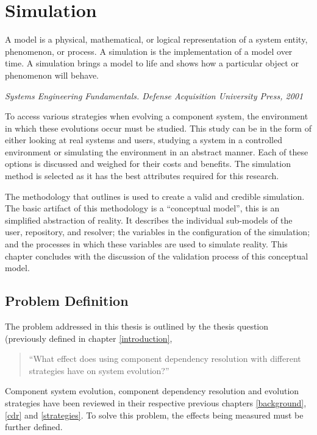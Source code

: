 \chapter{Simulation}
\label{simulation}
\epigraph{A model is a physical, mathematical, or logical representation of a system entity, phenomenon, or process. 
A simulation is the implementation of a model over time. 
A simulation brings a model to life and shows how a particular object or phenomenon will behave.}
{\textit{Systems Engineering Fundamentals. Defense Acquisition University Press, 2001}}

{}To access various strategies when evolving a component system, the environment in which these evolutions occur must be studied.
{}This study can be in the form of either looking at real systems and users, studying a system in a controlled environment or simulating the environment in an abstract manner.
{}Each of these options is discussed and weighed for their costs and benefits.
{}The simulation method is selected as it has the best attributes required for this research.

{}The methodology that \citep{Law2005} outlines is used to create a valid and credible simulation.
{}The basic artifact of this methodology is a ``conceptual model'', this is an simplified abstraction of reality.
{}It describes the individual sub-models of the user, repository, and resolver; the variables in the configuration of the simulation;
{}and the processes in which these variables are used to simulate reality.
{}This chapter concludes with the discussion of the validation process of this conceptual model.

\section{Problem Definition}
The problem addressed in this thesis is outlined by the thesis question (previously defined in chapter \ref{introduction},

\begin{quotation}
``What effect does using component dependency resolution with different strategies have on system evolution?''
\end{quotation}

Component system evolution, component dependency resolution and evolution strategies have been reviewed in their respective previous chapters \ref{background}, \ref{cdr} and \ref{strategies}.
To solve this problem, the effects being measured must be further defined.

